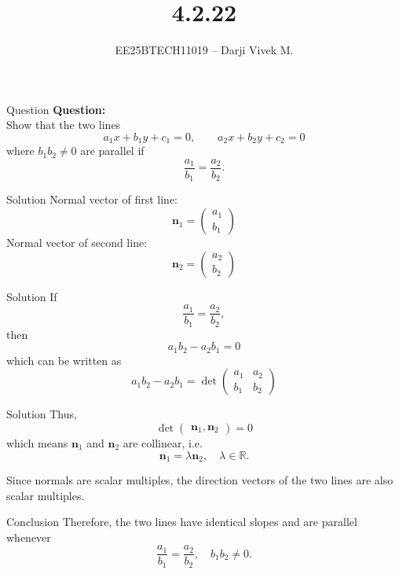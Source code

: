 \documentclass{beamer}
\title{4.2.22}
\author{EE25BTECH11019 -- Darji Vivek M.}
\date{}
\newcommand{\myvec}[1]{\begin{pmatrix}#1\end{pmatrix}}
\renewcommand{\vec}[1]{\mathbf{#1}}
\begin{document}
\begin{frame}
\begin{titlepage}

\end{titlepage}
\end{frame}
\begin{frame}{Question}
\textbf{Question:}\\[6pt]
Show that the two lines
\[
a_1 x + b_1 y + c_1 = 0,\qquad a_2 x + b_2 y + c_2 = 0
\]
where $b_1 b_2 \neq 0$ are parallel if 
\[
\frac{a_1}{b_1}=\frac{a_2}{b_2}.
\]
\end{frame}

\begin{frame}{Solution}
Normal vector of first line:
\[
\vec{n}_1 = \myvec{a_1 \\ b_1}
\]
Normal vector of second line:
\[
\vec{n}_2 = \myvec{a_2 \\ b_2}
\]
\end{frame}
\begin{frame}{Solution}
If 
\[
\frac{a_1}{b_1}=\frac{a_2}{b_2},
\]
then
\[
a_1 b_2 - a_2 b_1 = 0
\]
which can be written as
\[
a_1 b_2 - a_2 b_1 = 
\det\myvec{a_1 & a_2 \\ b_1 & b_2}
\]
\end{frame}
\begin{frame}{Solution}
Thus,
\[
\det\myvec{\vec{n}_1, \vec{n}_2} = 0
\]
which means $\vec{n}_1$ and $\vec{n}_2$ are collinear, i.e.
\[
\vec{n}_1 = \lambda \vec{n}_2, \quad \lambda \in \mathbb{R}.
\]

Since normals are scalar multiples, the direction vectors of the two lines are also scalar multiples.  
\end{frame}
\begin{frame}{Conclusion}
Therefore, the two lines have identical slopes and are parallel whenever
\[
\frac{a_1}{b_1} = \frac{a_2}{b_2}, 
\quad b_1 b_2 \neq 0.
\]
\end{frame}
\end{document}
